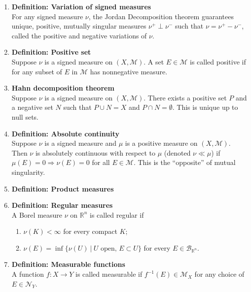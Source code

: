 \documentclass{article}
\begin{document}
\begin{enumerate}
  \item \textbf{Definition: Variation of signed measures}\\
    For any signed measure $\nu$, the Jordan Decomposition theorem guarantees
    unique, positive, mutually singular measures $\nu^+ \perp \nu^-$ such that
    $\nu = \nu^+ - \nu^-$, called the positive and negative variations of $\nu$.
  \item \textbf{Definition: Positive set}\\
    Suppose $\nu$ is a signed measure on $(X, \mathcal M)$.
    A set $E \in \mathcal M$ is called positive if for any subset of $E$ in $\mathcal M$
    has nonnegative measure.
  \item \textbf{Hahn decomposition theorem}\\
    Suppose $\nu$ is a signed measure on $(X, \mathcal M)$. There exists a
    positive set $P$ and a negative set $N$ such that $P \cup N = X$ and
    $P \cap N = \emptyset$. This is unique up to null sets.
  \item \textbf{Definition: Absolute continuity}\\
    Suppose $\nu$ is a signed measure and $\mu$ is a positive measure on
    $(X, \mathcal M)$. Then $\nu$ is absolutely continuous with respect to $\mu$
    (denoted $\nu \ll \mu$) if $\mu(E) = 0 \Rightarrow \nu(E) = 0$ for all
    $E \in \mathcal M$. This is the ``opposite'' of mutual singularity.
  \item \textbf{Definition: Product measures}\\
  \item \textbf{Definition: Regular measures}\\
    A Borel measure $\nu$ on $\mathbb R^n$ is called regular if \begin{enumerate}
      \item $\nu(K) < \infty$ for every compact $K$;
      \item $\nu(E) = \inf\{\nu(U)\ |\ U \text{ open, } E \subset U\}$ for every
      $E \in \mathcal B_{\mathbb R^n}$.
    \end{enumerate}
  \item \textbf{Definition: Measurable functions}\\
    A function $f\colon X \rightarrow Y$ is called measurable if
    $f^{-1}(E) \in \mathcal M_X$ for any choice of $E \in \mathcal N_Y$.

\end{enumerate}
\end{document}

